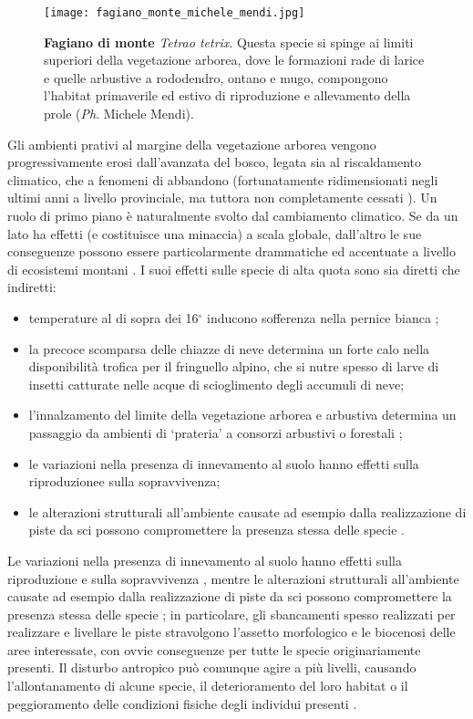 \documentclass[10pt,twoside,openany,x11names,svgnames,italian,a5paper,dvipsnames,table]{memoir}
\newcommand{\ph}{\emph{Ph}. }
\begin{document}
\begin{wrapfigure}[19]{r}{.6\columnwidth}
\centering
  \texttt{[image: fagiano\_monte\_michele\_mendi.jpg]}
  \caption*{\textbf{Fagiano di monte} \emph{Tetrao tetrix}. Questa specie si spinge ai limiti superiori della vegetazione arborea, dove le formazioni rade di larice e quelle arbustive a rododendro, ontano e mugo, compongono l’habitat primaverile ed estivo di riproduzione e allevamento della prole (\ph Michele Mendi).}
\end{wrapfigure}Gli ambienti prativi al margine della vegetazione arborea vengono progressivamente erosi dall’avanzata del bosco, legata sia al riscaldamento climatico, che a fenomeni di abbandono (fortunatamente ridimensionati negli ultimi anni a livello provinciale, ma tuttora non completamente cessati \cite{Pedrini01} \cite{Pedrini02} \cite{Laiolo04} \cite{Chamberlain13}). Un ruolo di primo piano è naturalmente svolto dal cambiamento climatico. Se da un lato ha effetti (e costituisce una minaccia) a scala globale, dall’altro le sue conseguenze possono essere particolarmente drammatiche ed accentuate a livello di ecosistemi montani \cite{Dirnbock11}. I suoi effetti sulle specie di alta quota sono sia diretti che indiretti: 
\newpage
\begin{itemize}\itemsep0pt
  \item temperature al di sopra dei 16$^\circ$ inducono sofferenza nella pernice bianca \cite{Zbinden03}; 
  \item la precoce scomparsa delle chiazze di neve determina un forte calo nella disponibilità trofica per il fringuello alpino, che si nutre spesso di larve di insetti catturate nelle acque di scioglimento degli accumuli di neve; 
  \item l’innalzamento del limite della vegetazione arborea e arbustiva determina un passaggio da ambienti di ‘prateria’ a consorzi arbustivi o forestali \cite{Brambilla14};
  \item le variazioni nella presenza di innevamento al suolo hanno effetti sulla riproduzionee sulla sopravvivenza\cite{Novoa08}; 
  \item le alterazioni strutturali all’ambiente causate ad esempio dalla realizzazione di piste da sci possono compromettere la presenza stessa delle specie \cite{Chamberlain13}.
\end{itemize}

Le variazioni nella presenza di innevamento al suolo hanno effetti sulla riproduzione e sulla sopravvivenza \cite{Novoa08}, mentre le alterazioni strutturali all’ambiente causate ad esempio dalla realizzazione di piste da sci possono compromettere la presenza stessa delle specie \cite{Rolando07} \cite{Caprio11}; in particolare, gli sbancamenti spesso realizzati per realizzare e livellare le piste stravolgono l’assetto morfologico e le biocenosi delle aree interessate, con ovvie conseguenze per tutte le specie originariamente presenti. 
Il disturbo antropico può comunque agire a più livelli, causando l’allontanamento di alcune specie, il deterioramento del loro habitat o il peggioramento delle condizioni fisiche degli individui presenti \cite{Arlettaz07}.
\end{document}
